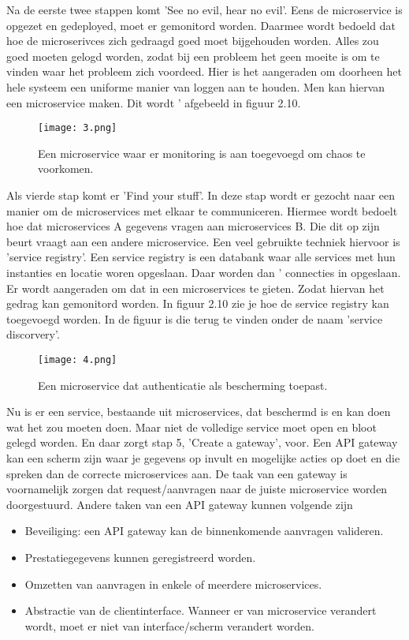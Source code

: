 Na de eerste twee stappen komt 'See no evil, hear no evil'. Eens de microservice is opgezet en gedeployed, moet er gemonitord worden. Daarmee wordt bedoeld dat hoe de microserivces zich gedraagd goed moet bijgehouden worden. Alles zou goed moeten gelogd worden, zodat bij een probleem het geen moeite is om te vinden waar het probleem zich voordeed. Hier is het aangeraden om doorheen het hele systeem een uniforme manier van loggen aan te houden. Men kan hiervan een microservice maken. Dit wordt ' afgebeeld in figuur 2.10.
\begin{figure}[h]
	\texttt{[image: 3.png]}
	\caption{Een microservice waar er monitoring is aan toegevoegd om chaos te voorkomen. \textcite{Benetis2016}}
	\centering
\end{figure}

Als vierde stap komt er 'Find your stuff'. In deze stap wordt er gezocht naar een manier om de microservices met elkaar te communiceren. Hiermee wordt bedoelt hoe dat microservices A gegevens vragen aan microservices B. Die dit op zijn beurt vraagt aan  een andere microservice. Een veel gebruikte techniek hiervoor is 'service registry'. Een service registry is een databank waar alle services met hun instanties en locatie woren opgeslaan. Daar worden dan ' connecties in opgeslaan. Er wordt aangeraden om dat in een microservices te gieten. Zodat hiervan het gedrag kan gemonitord worden. In figuur 2.10 zie je hoe de service registry kan toegevoegd worden. In de figuur is die terug te vinden onder de naam 'service discorvery'.
\begin{figure}[h]
	\texttt{[image: 4.png]}
	\caption{Een microservice dat authenticatie als bescherming toepast. \textcite{Benetis2016}}
	\centering
\end{figure}

Nu is er een service, bestaande uit microservices, dat beschermd is en kan doen wat het zou moeten doen. Maar niet de  volledige service moet open en bloot gelegd worden. En daar zorgt stap 5, 'Create a gateway', voor. Een API gateway kan een scherm zijn waar je gegevens op invult en mogelijke acties op doet en die spreken dan de correcte microservices aan. De taak van een gateway is voornamelijk zorgen dat request/aanvragen naar de juiste microservice worden doorgestuurd. Andere taken van een API gateway kunnen volgende zijn
\begin{itemize}
	\item Beveiliging: een API gateway kan de binnenkomende aanvragen valideren. 
	\item Prestatiegegevens kunnen geregistreerd worden.
	\item Omzetten van aanvragen in enkele of meerdere microservices.
	\item Abstractie van de clientinterface. Wanneer er van microservice verandert wordt, moet er niet van interface/scherm verandert worden. 
\end{itemize}

